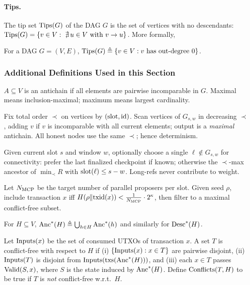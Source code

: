 \paragraph{Tips.} The tip set $\mathrm{Tips}(G)$ of the DAG $G$ is the set of vertices with no descendants: $\mathrm{Tips}(G)=\{v\in V:\ \nexists\,u\in V \text{ with } v\to u\}$. More formally, 

\begin{definition}[Tips]
For a DAG $G=(V,E)$, $\mathrm{Tips}(G)\triangleq\{v\in V:\text{$v$ has out-degree $0$}\}$.
\end{definition}

\subsubsection*{Additional Definitions Used in this Section}

\begin{definition}
$A\subseteq V$ is an antichain if all elements are pairwise incomparable in $G$. Maximal means inclusion-maximal; maximum means largest cardinality.
\end{definition}


\begin{definition}[\GreedyAntichain\ on $G_{s,w}$]
Fix total order $\prec$ on vertices by $(\mathrm{slot},\mathrm{id})$. Scan vertices of $G_{s,w}$ in decreasing $\prec$, adding $v$ if $v$ is incomparable with all current elements; output is a \emph{maximal} antichain. All honest nodes use the same $\prec$; hence determinism.
\end{definition}






\begin{definition}[\OptionalLongRef]
Given current slot $s$ and window $w$, optionally choose a single $\ell\notin G_{s,w}$ for connectivity: prefer the last finalized checkpoint if known; otherwise the $\prec$-max ancestor of $\min_{\prec}R$ with $\mathrm{slot}(\ell)\le s-w$. Long-refs never contribute to weight.
\end{definition}
\begin{definition}[\SampleMempool]
Let $N_{\mathrm{MCP}}$ be the target number of parallel proposers per slot. Given seed $\rho$, include transaction $x$ iff 
$H(\rho\|\mathrm{txid}(x))<\tfrac{1}{N_{\mathrm{MCP}}}\cdot 2^\kappa$, then filter to a maximal conflict-free subset.
\end{definition}
\begin{definition}
For $H\subseteq V$, $\mathrm{Anc}^*(H)\triangleq \bigcup_{h\in H}\mathrm{Anc}^*(h)$ and similarly for $\mathrm{Desc}^*(H)$.
\end{definition}
\begin{definition}
Let $\mathrm{Inputs}(x)$ be the set of consumed UTXOs of transaction $x$. A set $T$ is conflict-free with respect to $H$ if (i) $\{\mathrm{Inputs}(x):x\in T\}$ are pairwise disjoint,
(ii) $\mathrm{Inputs}(T)$ is disjoint from $\mathrm{Inputs}(\mathrm{txs}(\mathrm{Anc}^*(H)))$, and (iii) each $x\in T$ passes $\mathrm{Valid}(S,x)$, where $S$ is the state induced by $\mathrm{Anc}^*(H)$. Define $\mathrm{Conflicts}(T,H)$ to be true if $T$ is \emph{not} conflict-free w.r.t.\ $H$.
\end{definition}

